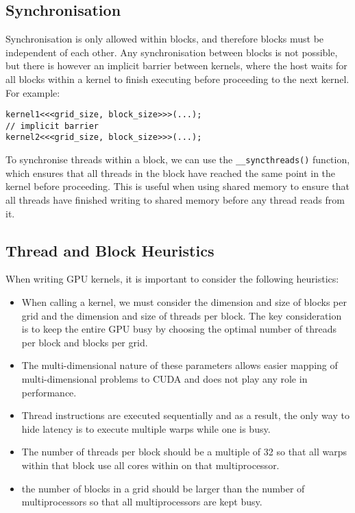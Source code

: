 \documentclass{article}
\begin{document}
\subsection{Synchronisation}
Synchronisation is only allowed within blocks, and therefore blocks
must be independent of each other. Any synchronisation between blocks
is not possible, but there is however an implicit barrier between
kernels, where the host waits for all blocks within a kernel to finish
executing before proceeding to the next kernel. For example:
\begin{verbatim}
kernel1<<<grid_size, block_size>>>(...);
// implicit barrier
kernel2<<<grid_size, block_size>>>(...);
\end{verbatim}
To synchronise threads within a block, we can use the
\texttt{__syncthreads()} function, which ensures that all
threads in the block have reached the same point in the kernel before
proceeding. This is useful when using shared memory to ensure that all
threads have finished writing to shared memory before any thread reads
from it.
\subsection{Thread and Block Heuristics}
When writing GPU kernels, it is important to consider the following
heuristics:
\begin{itemize}
    \item When calling a kernel, we must consider the dimension and
          size of blocks per grid and the dimension and size of threads
          per block. The key consideration is to keep the entire GPU
          busy by choosing the optimal number of threads per block and
          blocks per grid.
    \item The multi-dimensional nature of these parameters allows
          easier mapping of multi-dimensional problems to CUDA and does
          not play any role in performance.
    \item Thread instructions are executed sequentially and as a
          result, the only way to hide latency is to execute multiple
          warps while one is busy.
    \item The number of threads per block should be a multiple of 32 so
          that all warps within that block use all cores within on that
          multiprocessor.
    \item the number of blocks in a grid should be larger than the
          number of multiprocessors so that all multiprocessors are kept
          busy.
\end{itemize}
\end{document}
